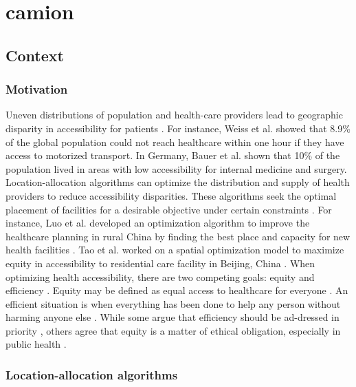 \chapter{\acf{camion}}

\section{Context}

\subsection{Motivation}

Uneven distributions of population and health-care providers lead to geographic disparity in accessibility for patients \cite{wang_why_2020}. For instance, Weiss et al. \cite{weiss_global_2020} showed that 8.9\% of the global population could not reach healthcare within one hour if they have access to motorized transport. In Germany, Bauer et al. \cite{bauer_spatial_2020} shown that 10\% of the population lived in areas with low accessibility for internal medicine and surgery. Location-allocation algorithms \cite{church_location_1999} can optimize the distribution and supply of health providers to reduce accessibility disparities. These algorithms seek the optimal placement of facilities for a desirable objective under certain constraints \cite{wang_measurement_2012}. For instance, Luo et al. developed an optimization algorithm to improve the healthcare planning in rural China by finding the best place and capacity for new health facilities \cite{luo_integrating_2014}. Tao et al. worked on a spatial optimization model to maximize equity in accessibility to residential care facility in Beijing, China \cite{tao_spatial_2014}. When optimizing health accessibility, there are two competing goals: equity and efficiency \cite{krugman_opinion_2013,meyer_equity_2008}. Equity may be defined as equal access to healthcare for everyone \cite{culyer_equity_1993}. An efficient situation is when everything has been done to help any person without harming anyone else \cite{hemenway_optimal_1982}. While some argue that efficiency should be ad-dressed in priority \cite{hemenway_optimal_1982}, others agree that equity is a matter of ethical obligation, especially in public health \cite{fried_rights_1975, oliver_equity_2004}.

\subsection{Location-allocation algorithms}

